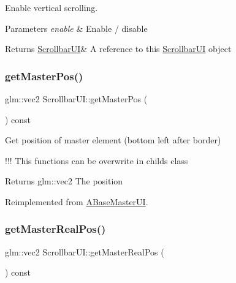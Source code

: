 Enable vertical scrolling. 


\begin{DoxyParams}{Parameters}
{\em enable} & Enable / disable \\
\hline
\end{DoxyParams}
\begin{DoxyReturn}{Returns}
\hyperlink{class_scrollbar_u_i}{Scrollbar\+UI}\& A reference to \textquotesingle{}this\textquotesingle{} \hyperlink{class_scrollbar_u_i}{Scrollbar\+UI} object 
\end{DoxyReturn}
\mbox{\label{class_scrollbar_u_i_a3a4c39a263f6bf7783b1054f57a26ee7}} 
\subsubsection{\texorpdfstring{get\+Master\+Pos()}{getMasterPos()}}
{\footnotesize\ttfamily glm\+::vec2 Scrollbar\+U\+I\+::get\+Master\+Pos (\begin{DoxyParamCaption}{ }\end{DoxyParamCaption}) const\hspace{0.3cm}{\ttfamily [virtual]}}



Get position of master element (bottom left after border) 

!!! This functions can be overwrite in childs class

\begin{DoxyReturn}{Returns}
glm\+::vec2 The position 
\end{DoxyReturn}


Reimplemented from \hyperlink{class_a_base_master_u_i_aec1bb7871f82b2bd41de4fe4486e4050}{A\+Base\+Master\+UI}.

\mbox{\label{class_scrollbar_u_i_a7dd8afe939f8b8a5f9486eeec1f56d92}} 
\subsubsection{\texorpdfstring{get\+Master\+Real\+Pos()}{getMasterRealPos()}}
{\footnotesize\ttfamily glm\+::vec2 Scrollbar\+U\+I\+::get\+Master\+Real\+Pos (\begin{DoxyParamCaption}{ }\end{DoxyParamCaption}) const\hspace{0.3cm}{\ttfamily [virtual]}}




